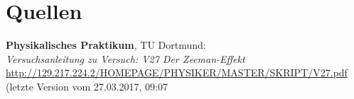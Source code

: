 \documentclass[captions=tableheading]{scrartcl}
\begin{document}
\section{Quellen}
\begin{enumerate}[label={[\arabic*]}]
\item \label{q:anleitung} \textbf{Physikalisches Praktikum}, TU Dortmund: \\
\textit{Versuchsanleitung zu Versuch: V27 Der Zeeman-Effekt} \\
\url{http://129.217.224.2/HOMEPAGE/PHYSIKER/MASTER/SKRIPT/V27.pdf} (letzte Version vom 27.03.2017, 09:07
\end{enumerate}
\end{document}
